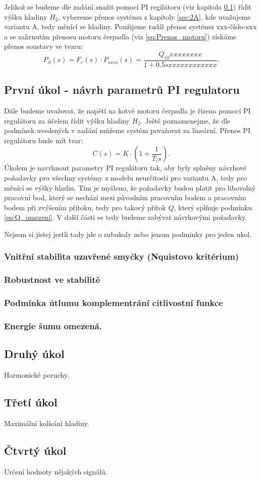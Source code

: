 \documentclass[a4paper,11pt]{article}
\begin{document}
Jelikož se budeme dle zadání snažit pomocí PI regilátoru (viz kapitola \ref{sec:PI}) řídit výšku hladiny $ H_{2} $, vybereme přenos systému z kapitoly \ref{sec:2A}, kde uvažujeme variantu A, tedy měnící se hladiny. Použijeme tudíž přenos systému xxx-číslo-xxx a se zahrnutím přenosu motoru čerpadla (viz \ref{eq:Prenos_motoru}) získáme přenos soustavy ve tvaru:
\begin{equation}\label{eq:Prenos_soustavy_s_motorem} 
P_{S}\left ( s \right )=F_{c}\left ( s \right )\cdot P_{neco}\left ( s \right )=\frac{Q_{10}xxxxxxxx}{1+0.5sxxxxxxxxxxxx}.
\end{equation}

\subsection{První úkol - návrh parametrů PI regulatoru}\label{sec:PI} 
Dále budeme uvažovat, že napětí na kotvě motoru čerpadla je řízeno pomocí PI regulátoru za účelem řídit výšku hladiny $ H_{2} $. Ještě poznamenejme, že  dle podmínek uvedených v zadání můžeme systém považovat za lineární. Přenos PI regulátoru bude mít tvar:
\begin{equation}\label{eq:Prenos_regulatoru} 
C\left ( s \right )=K\cdot \left ( 1+\frac{1}{T_{i}s} \right ).
\end{equation}
Úkolem je navrhnout parametry PI regulátoru tak, aby byly splněny návrhové požadavky pro všechny systémy z modelu neurčitosti pro variantu A, tedy pro měnící se výšky hladin. Tím je myšleno, že požadavky budou platit pro libovolný pracovní bod, který se nechází mezi původním pracovním bodem a pracovním bodem při zvýšením přítoku, tedy pro takový přítok $ Q $, který splňuje podmínku \ref{eq:Q_omezeni}. V další části se tedy budeme zabývat návrhovými požadavky.








Nejsem si jistej jestli tady jde o subukoly nebo jenom podminky pro jeden ukol.
\subsubsection{Vnitřní stabilita uzavřené smyčky (Nquistovo kritérium)}
\subsubsection{Robustnost ve stabilitě}
\subsubsection{Podmínka útlumu komplementrání citlivostní funkce}
\subsubsection{Energie šumu omezená.}
\subsection{Druhý úkol}
Harmonické poruchy.
\subsection{Třetí úkol}
Maximální kolísání hladiny.
\subsection{Čtvrtý úkol}
Určení hodnoty nějakých signálů.
\end{document}
